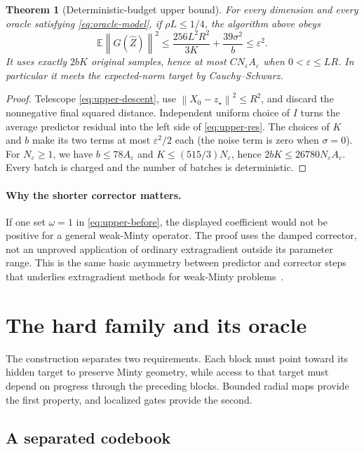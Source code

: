 \documentclass[11pt,a4paper]{article}
\newcommand{\E}{\mathbb E}
\newcommand{\eps}{\varepsilon}
\newcommand{\norm}[1]{\left\lVert #1\right\rVert}
\newtheorem{theorem}{Theorem}[section]
\theoremstyle{definition}
\theoremstyle{remark}
\begin{document}
\begin{theorem}[Deterministic-budget upper bound]\label{thm:upper}
For every dimension and every oracle satisfying \eqref{eq:oracle-model}, if $\rho L\le1/4$, the algorithm above obeys
\begin{equation}\label{eq:upper-res}
 \E\norm{G(\widehat Z)}^2
 \le\frac{256L^2R^2}{3K}+\frac{39\sigma^2}{b}
 \le\eps^2.
\end{equation}
It uses exactly $2bK$ original samples, hence at most $C N_\eps A_\eps$ when $0<\eps\le LR$. In particular it meets the expected-norm target by Cauchy--Schwarz.
\end{theorem}
\begin{proof}
Telescope \eqref{eq:upper-descent}, use $\norm{X_0-z_\star}^2\le R^2$, and discard the nonnegative final squared distance. Independent uniform choice of $I$ turns the average predictor residual into the left side of \eqref{eq:upper-res}. The choices of $K$ and $b$ make its two terms at most $\eps^2/2$ each (the noise term is zero when $\sigma=0$). For $N_\eps\ge1$, we have $b\le78A_\eps$ and $K\le(515/3)N_\eps$, hence $2bK\le26780N_\eps A_\eps$. Every batch is charged and the number of batches is deterministic.
\end{proof}

\paragraph{Why the shorter corrector matters.}
If one set $\omega=1$ in \eqref{eq:upper-before}, the displayed coefficient would not be positive for a general weak-Minty operator. The proof uses the damped corrector, not an unproved application of ordinary extragradient outside its parameter range. This is the same basic asymmetry between predictor and corrector steps that underlies extragradient methods for weak-Minty problems~\cite{ddj2021}.


\section{The hard family and its oracle}\label{sec:construction}
The construction separates two requirements. Each block must point toward
its hidden target to preserve Minty geometry, while access to that target
must depend on progress through the preceding blocks. Bounded radial maps
provide the first property, and localized gates provide the second.

\subsection{A separated codebook}\label{sec:code}
\end{document}
